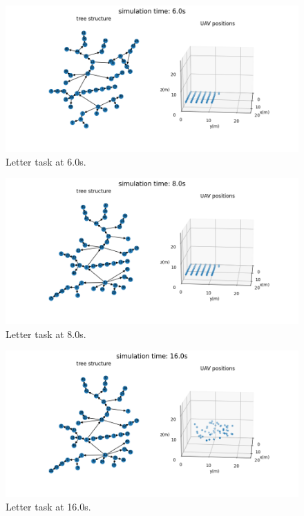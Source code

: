 \begin{figure}[htbp]
  \centering
  \includegraphics[width=0.96\linewidth]{rsc/lttr.07.png}
  \caption{Letter task at 6.0s.}
  \label{fig:sim_lttr_060}
\end{figure}

\begin{figure}[htbp]
  \centering
  \includegraphics[width=0.96\linewidth]{rsc/lttr.08.png}
  \caption{Letter task at 8.0s.}
  \label{fig:sim_lttr_080}
\end{figure}

\begin{figure}[htbp]
  \centering
  \includegraphics[width=0.96\linewidth]{rsc/lttr.12.png}
  \caption{Letter task at 16.0s.}
  \label{fig:sim_lttr_160}
\end{figure}

